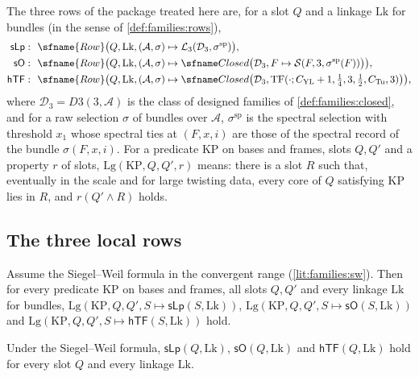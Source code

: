 The three rows of the package treated here are, for a slot $Q$ and a linkage $\mathrm{Lk}$ for bundles (in the
sense of \cref{def:families:rows}),
\begin{align*}
\mathsf{sLp}:&\ \ \sfname{Row}\bigl(Q,\mathrm{Lk},(\mathcal A,\sigma)\mapsto
\mathcal{L}_{3}(\mathcal D_3,\sigma^{\mathrm{sp}})\bigr),\\
\mathsf{sO}:&\ \ \sfname{Row}\bigl(Q,\mathrm{Lk},(\mathcal A,\sigma)\mapsto
\thmSClosed\bigl(\mathcal D_3,F\mapsto\mathcal{S}(F,3,\sigma^{\mathrm{sp}}(F))\bigr)\bigr),\\
\mathsf{hTF}:&\ \ \sfname{Row}\bigl(Q,\mathrm{Lk},(\mathcal A,\sigma)\mapsto
\thmSClosed\bigl(\mathcal D_3,\mathrm{TF}(\cdot;C_{\mathrm{YL}}+1,\tfrac14,3,\tfrac12,C_{\mathrm{Tu}},3)\bigr)\bigr),
\end{align*}
where $\mathcal D_3=D3(3,\mathcal A)$ is the class of designed families of \cref{def:families:closed}, and for a raw
selection $\sigma$ of bundles over $\mathcal A$, $\sigma^{\mathrm{sp}}$ is the spectral selection with threshold $x_1$
whose spectral ties at $(F,x,i)$ are those of the spectral record of the bundle $\sigma(F,x,i)$.
For a predicate $\mathrm{KP}$ on bases and frames, slots $Q,Q'$ and a property $r$ of slots, $\mathrm{Lg}(\mathrm{KP},
Q,Q',r)$ means: there is a slot $R$ such that, eventually in the scale and for large twisting data, every core of $Q$
satisfying $\mathrm{KP}$ lies in $R$, and $r(Q'\wedge R)$ holds.

\subsection{The three local rows}\label{sec:pf:thmS:rows}

\begin{theorem}\label{pf:thmS:lg1}
Assume the Siegel--Weil formula in the convergent range (\cref{lit:families:sw}). Then for every predicate
$\mathrm{KP}$ on bases and frames, all slots $Q,Q'$ and every linkage $\mathrm{Lk}$ for bundles,
$\mathrm{Lg}(\mathrm{KP},Q,Q',S\mapsto\mathsf{sLp}(S,\mathrm{Lk}))$, $\mathrm{Lg}(\mathrm{KP},Q,Q',
S\mapsto\mathsf{sO}(S,\mathrm{Lk}))$ and $\mathrm{Lg}(\mathrm{KP},Q,Q',S\mapsto\mathsf{hTF}(S,\mathrm{Lk}))$ hold.
\end{theorem}

\begin{proposition}\label{pf:thmS:everyslot}
Under the Siegel--Weil formula, $\mathsf{sLp}(Q,\mathrm{Lk})$, $\mathsf{sO}(Q,\mathrm{Lk})$ and $\mathsf{hTF}(Q,\mathrm{Lk})$
hold for every slot $Q$ and every linkage $\mathrm{Lk}$.
\end{proposition}

